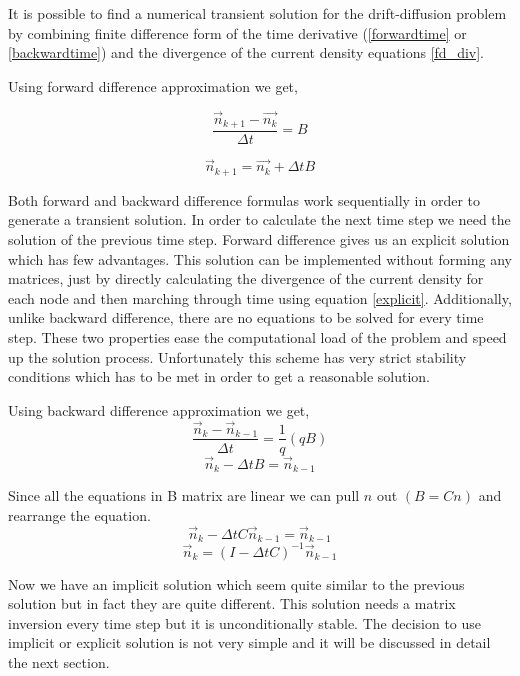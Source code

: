 It is possible to find a numerical transient solution for the drift-diffusion problem by combining finite difference form of the time derivative (\eqref{forwardtime} or \eqref{backwardtime}) and the divergence of the current density equations \eqref{fd_div}.

Using forward difference approximation we get,

\begin{equation}\nonumber
\frac{ \vec{n}_{k+1}-\vec{n_k}}{\Delta t}=B
\end{equation}

\begin{equation}
\vec{n}_{k+1}=\vec{n_{k}}+\Delta t B
\label{explicit}
\end{equation}

Both forward and backward difference formulas work sequentially in order to generate a transient solution. In order to calculate the next time step we need the solution of the previous time step. Forward difference gives us an explicit solution which has few advantages. This solution can be implemented without forming any matrices, just by directly calculating the divergence of the current density for each node and then marching through time using equation \ref{explicit}. Additionally, unlike backward difference, there are no equations to be solved for every time step. These two properties ease the computational load of the problem and speed up the solution process. Unfortunately this scheme has very strict stability conditions which has to be met in order to get a reasonable solution.

Using backward difference approximation we get,
\begin{equation}\nonumber
\frac{ \vec{n}_{k}-\vec{n}_{k-1}}{\Delta t}=\frac{1}{q}(qB)
\end{equation}
\begin{equation}\nonumber
\vec{n}_{k}-\Delta t B =\vec{n}_{k-1}
\end{equation}

Since all the equations in B matrix are linear we can pull $n$ out $(B=Cn)$ and rearrange the equation.
\begin{equation}\nonumber
\vec{n}_{k}-\Delta t C\vec{n}_{k-1} =\vec{n}_{k-1}
\end{equation}
\begin{equation}
\vec{n}_k=(I-\Delta t C)^{-1}\vec{n}_{k-1}
\end{equation}

Now we have an implicit solution which seem quite similar to the previous solution but in fact they are quite different. This solution needs a matrix inversion every time step but it is unconditionally stable. The decision to use implicit or explicit solution is not very simple and it will be discussed in detail the next section.
\clearpage
